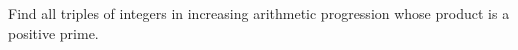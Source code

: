 Find all triples of integers in increasing arithmetic progression whose product is a positive prime.

